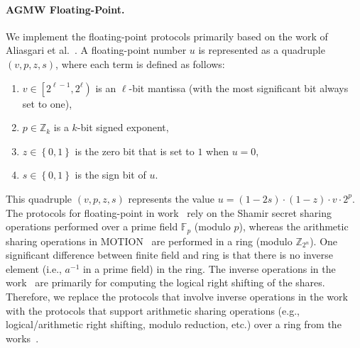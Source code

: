 \paragraph{AGMW Floating-Point.}
\label{para:AGMWFloating-Point}
We implement the \arithmeticGMW floating-point protocols primarily based on the work of Aliasgari et al.~\cite{aliasgari2012secure}.
A floating-point number $u$ is represented as a quadruple $\left(v, p, z, s\right) $, where each term is defined as follows:
\begin{enumerate}
      \item $v\in \left[2^{\ell-1},2^{\ell}\right) $ is an $\ell$-bit mantissa (with the most significant bit always set to one),
      \item $p\in \mathbb{Z} _k$ is a $k$-bit signed exponent,
      \item $z\in \left\{0,1\right\} $ is the zero bit that is set to $1$ when $u=0$,
      \item $s\in \left\{0,1\right\}$ is the sign bit of $u$.
\end{enumerate}
This quadruple $\left(v, p, z, s\right) $ represents the value $u= \left(1-2s\right) \cdot \left(1-z\right) \cdot v \cdot 2^p$.
The \smpc protocols for floating-point in work~\cite{aliasgari2012secure} rely on the Shamir secret sharing~\cite{shamir1979share} operations performed over a prime field $\mathbb{F}_p$ (modulo $p$), whereas the arithmetic sharing operations in MOTION~\cite{braun2022motion} are performed in a ring (modulo $\mathbb{Z} _{2^{n}}$). One significant difference between finite field and ring is that there is no inverse element (i.e., $a^{-1}$ in a prime field) in the ring. The inverse operations in the work~\cite{aliasgari2012secure} are primarily for computing the logical right shifting of the shares.
Therefore, we replace the protocols that involve inverse operations in the work~\cite{aliasgari2012secure} with the \smpc protocols that support arithmetic sharing operations (e.g., logical/arithmetic right shifting, modulo reduction, etc.) over a ring from the works~\cite{escudero2020improved,dalskov2020secure,makri2021rabbit}.

